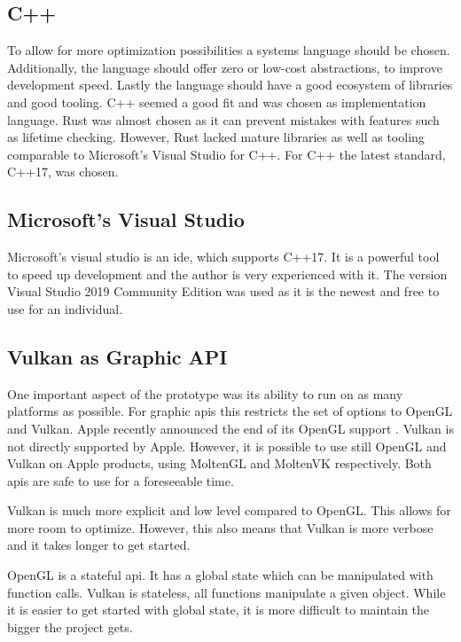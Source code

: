 \subsection{C++}
To allow for more optimization possibilities a systems language should be chosen. Additionally, the language should offer zero or low-cost abstractions, to improve development speed. Lastly the language should have a good ecosystem of libraries and good tooling. C++ seemed a good fit and was chosen as implementation language. Rust \cite{rustlang} was almost chosen as it can prevent mistakes with features such as lifetime checking. However, Rust lacked mature libraries as well as tooling comparable to Microsoft's Visual Studio \cite{microsoft:visualstudio} for C++. For C++ the latest standard, C++17, was chosen.

\subsection{Microsoft's Visual Studio}
Microsoft's visual studio is an \gls{ide}, which supports C++17. It is a powerful tool to speed up development and the author is very experienced with it. The version Visual Studio 2019 Community Edition was used as it is the newest and free to use for an individual.

\subsection{Vulkan as Graphic API}
One important aspect of the prototype was its ability to run on as many platforms as possible. %
For graphic \glspl{api} this restricts the set of options to OpenGL and Vulkan. Apple recently announced the end of its OpenGL support \cite{arstechnica:openGL}. Vulkan is not directly supported by Apple. However, it is possible to use still OpenGL and Vulkan on Apple products, using MoltenGL \cite{moltenGL} and MoltenVK \cite{moltenVK} respectively. Both \glspl{api} are safe to use for a foreseeable time.

Vulkan is much more explicit and low level compared to OpenGL. This allows for more room to optimize. However, this also means that Vulkan is more verbose and it takes longer to get started.

OpenGL is a stateful \gls{api}. It has a global state which can be manipulated with function calls. Vulkan is stateless, all functions manipulate a given object. While it is easier to get started with global state, it is more difficult to maintain the bigger the project gets.

